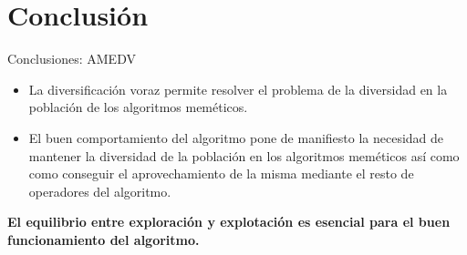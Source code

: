 
\section{Conclusión}

	\begin{frame}{Conclusiones: AMEDV}
		\begin{itemize}
			\item La diversificación voraz permite resolver el problema de la diversidad en la población de los algoritmos meméticos.
			\item El buen comportamiento del algoritmo pone de manifiesto la necesidad de mantener la diversidad de la población en los algoritmos meméticos así como como conseguir el aprovechamiento de la misma mediante el resto de operadores del algoritmo.
		\end{itemize}
		
		\begin{tcolorbox}[colback=blue!5,colframe=blue!30]
			\centering
			\color{blue!80} \textbf{El equilibrio entre exploración y explotación es esencial para el buen funcionamiento del algoritmo.}
		\end{tcolorbox}
	\end{frame}


